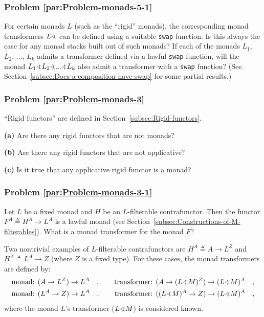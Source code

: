 \subsubsection{Problem \label{par:Problem-monads-5-1}\ref{par:Problem-monads-5-1}}

For certain monads $L$ (such as the \textsf{``}rigid\textsf{''} monads), the corresponding
monad transformers $L\varangle$ can be defined using a suitable \lstinline!swap!
function. Is this always the case for any monad stacks built out of
such monads? If each of the monads $L_{1}$, $L_{2}$, ..., $L_{k}$
admits a transformer defined via a lawful \lstinline!swap! function,
will the monad $L_{1}\varangle L_{2}\varangle...\varangle L_{k}$
also admit a transformer with a \lstinline!swap! function? (See Section~\ref{subsec:Does-a-composition-have-swap}
for some partial results.)

\subsubsection{Problem \label{par:Problem-monads-3}\ref{par:Problem-monads-3}}

\textsf{``}Rigid functors\textsf{''} are defined
in Section~\ref{subsec:Rigid-functors}.

\textbf{(a)} Are there any rigid functors that are not monads? 

\textbf{(b)} Are there any rigid functors that are not applicative?

\textbf{(c)} Is it true that any applicative rigid functor is a monad?

\subsubsection{Problem \label{par:Problem-monads-3-1}\ref{par:Problem-monads-3-1}}

Let $L$ be a fixed monad and $H$ be an $L$-filterable contrafunctor.
Then the functor $F^{A}\triangleq H^{A}\rightarrow L^{A}$ is a lawful
monad (see Section~\ref{subsec:Constructions-of-M-filterables}).
What is a monad transformer for the monad $F$? 

Two nontrivial examples of $L$-filterable contrafunctors are $H^{A}\triangleq A\rightarrow L^{Z}$
and $H^{A}\triangleq L^{A}\rightarrow Z$ (where $Z$ is a fixed type).
For these cases, the monad transformers are defined by:
\begin{align*}
 & \text{monad: }(A\rightarrow L^{Z})\rightarrow L^{A}\quad,\quad\quad\text{transformer: }(A\rightarrow(L\varangle M)^{Z})\rightarrow(L\varangle M)^{A}\quad,\\
 & \text{monad: }(L^{A}\rightarrow Z)\rightarrow L^{A}\quad,\quad\quad\text{transformer: }((L\varangle M)^{A}\rightarrow Z)\rightarrow(L\varangle M)^{A}\quad,
\end{align*}
where the monad $L$\textsf{'}s transformer ($L\varangle M$) is considered
known.

